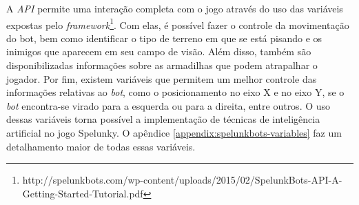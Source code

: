 A \textit{API} permite uma interação completa com o jogo através do uso
das variáveis expostas pelo
\textit{framework}\footnote{http://spelunkbots.com/wp-content/uploads/2015/02/SpelunkBots-API-A-Getting-Started-Tutorial.pdf}.
Com elas, é possível fazer o controle da movimentação do bot, bem
como identificar o tipo de terreno em que se está pisando e os inimigos que
aparecem em seu campo de visão. Além disso, também são disponibilizadas
informações sobre as armadilhas que podem atrapalhar o jogador. Por fim,
existem variáveis que permitem um melhor controle das informações relativas ao
\textit{bot}, como o posicionamento no eixo X e no eixo Y, se o \textit{bot}
encontra-se virado para a esquerda ou para a direita, entre outros. O uso dessas
variáveis torna possível a implementação de técnicas de inteligência artificial
no jogo Spelunky. O apêndice \ref{appendix:spelunkbots-variables} faz um
detalhamento maior de todas essas variáveis.
